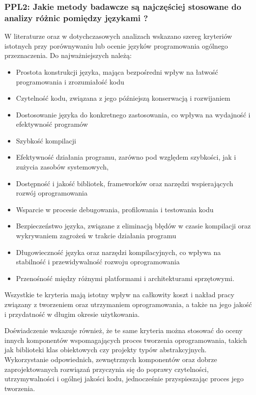 \subsubsection{PPL2: Jakie metody badawcze są najczęściej stosowane do analizy różnic pomiędzy językami ?}
W literaturze oraz w dotychczasowych analizach \cite{LanguageComparison_1,LanguageComparison_2,LanguageComparison_3,LanguageComparison_4} wskazano szereg kryteriów istotnych przy porównywaniu lub ocenie języków programowania ogólnego przeznaczenia. Do najważniejszych należą: 
    \begin{itemize}
        \item Prostota konstrukcji języka, mająca bezpośredni wpływ na łatwość programowania i zrozumiałość kodu
        \item Czytelność kodu, związana z jego późniejszą konserwacją i rozwijaniem
        \item Dostosowanie języka do konkretnego zastosowania, co wpływa na wydajność i efektywność programów
        \item Szybkość kompilacji
        \item Efektywność działania programu, zarówno pod względem szybkości, jak i zużycia zasobów systemowych,
        \item Dostępność i jakość bibliotek, frameworków oraz narzędzi wspierających rozwój oprogramowania
        \item Wsparcie w procesie debugowania, profilowania i testowania kodu
        \item Bezpieczeństwo języka, związane z eliminacją błędów w czasie kompilacji oraz wykrywaniem zagrożeń w trakcie działania programu
        \item Długowieczność języka oraz narzędzi kompilacyjnych, co wpływa na stabilność i przewidywalność rozwoju oprogramowania
        \item Przenośność między różnymi platformami i architekturami sprzętowymi.
    \end{itemize}
    Wszystkie te kryteria mają istotny wpływ na całkowity koszt i nakład pracy związany z tworzeniem oraz utrzymaniem oprogramowania, a także na jego jakość i przydatność w długim okresie użytkowania.

    Doświadczenie wskazuje również, że te same kryteria można stosować do oceny innych komponentów wspomagających proces tworzenia oprogramowania, takich jak biblioteki klas obiektowych czy projekty typów abstrakcyjnych. Wykorzystanie odpowiednich, zewnętrznych komponentów oraz dobrze zaprojektowanych rozwiązań przyczynia się do poprawy czytelności, utrzymywalności i ogólnej jakości kodu, jednocześnie przyspieszając proces jego tworzenia.


